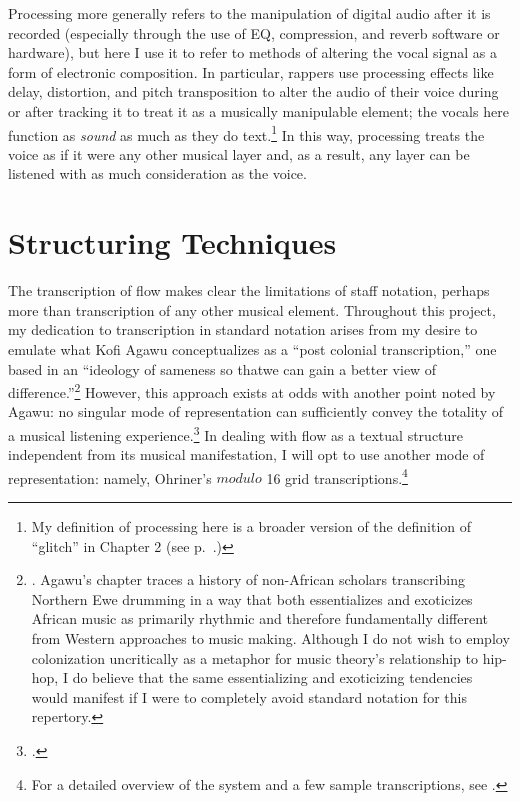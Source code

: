 Processing more generally refers to the manipulation of digital audio after it is recorded
(especially through the use of EQ, compression, and reverb software or hardware), but here 
I use it to refer to methods of altering the vocal signal as a form of electronic composition.
In particular, rappers use processing effects like delay, distortion, and pitch transposition
to alter the audio of their voice during or after tracking it to treat it as a musically 
manipulable element; the vocals here function as \emph{sound} as much as they do 
text.\footnote{
    My definition of processing here is a broader version of the definition of ``glitch'' 
    in Chapter 2 (see p.~\pageref{glitch}.)}
In this way, processing treats the voice as if it were any other musical layer and, as a 
result, any layer can be listened with as much consideration as the voice.

\section{Structuring Techniques}
The transcription of flow makes clear the limitations of staff notation, perhaps more than
transcription of any other musical element. Throughout this project, my dedication to 
transcription in standard notation arises from my desire to emulate what Kofi Agawu 
conceptualizes as a ``post  colonial transcription,'' one based in an ``ideology of 
sameness so that\textellipsis we can gain a better view of difference.''\footnote{
    \autocite[67]{kofiagawuInventionAfricanRhythm2003}. Agawu's chapter traces a history of 
    non-African scholars transcribing Northern Ewe drumming in a way that both essentializes
    and exoticizes African music as primarily rhythmic and therefore fundamentally different
    from Western approaches to music making. Although I do not wish to employ colonization 
    uncritically as a metaphor for music theory's relationship to hip-hop, I do believe that
    the same essentializing and exoticizing tendencies would manifest if I were to completely
    avoid standard notation for this repertory.}
However, this approach exists at odds with another point noted by Agawu: no singular mode
of representation can sufficiently convey the totality of a musical listening 
experience.\footnote{
    \autocite[187]{kofiagawuAfricanRhythmNorthern1995}.}
In dealing with flow as a textual structure independent from its musical manifestation, 
I will opt to use another mode of representation: namely, Ohriner's $modulo$ 16 grid 
transcriptions.\footnote{
    For a detailed overview of the system and a few sample transcriptions, see 
    \autocite[xxviii--xl, 7--9]{mitchellohrinerFlowRhythmicVoice2019}.}

